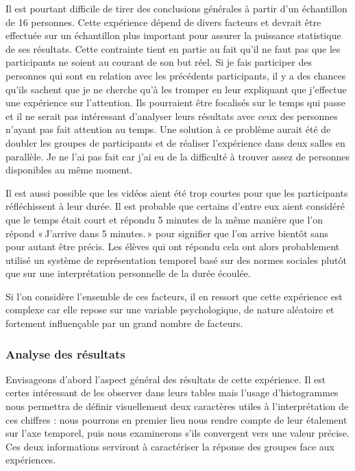\documentclass[12pt,fleqn,oneside,french,openany]{book} %
\begin{document}
Il est pourtant difficile de tirer des conclusions générales à partir d'un échantillon de 16 personnes. Cette expérience dépend de divers facteurs et devrait être effectuée sur un échantillon plus important pour assurer la puissance statistique de ses résultats. Cette contrainte tient en partie au fait qu'il ne faut pas que les participants ne soient au courant de son but réel. Si je fais participer des personnes qui sont en relation avec les précédents participants, il y a des chances qu'ils sachent que je ne cherche qu'à les tromper en leur expliquant que j'effectue une expérience sur l'attention. Ils pourraient être focalisés sur le temps qui passe et il ne serait pas intéressant d'analyser leurs résultats avec ceux des personnes n'ayant pas fait attention au temps. Une solution à ce problème aurait été de doubler les groupes de participants et de réaliser l'expérience dans deux salles en parallèle. Je ne l'ai pas fait car j'ai eu de la difficulté à trouver assez de personnes disponibles au même moment. 

Il est aussi possible que les vidéos aient été trop courtes pour que les participants réfléchissent à leur durée. Il est probable que certains d'entre eux aient considéré que le temps était court et répondu 5 minutes de la même manière que l'on répond «\,J'arrive dans 5 minutes.\,» pour signifier que l'on arrive bientôt sans pour autant être précis. Les élèves qui ont répondu cela ont alors probablement utilisé un système de représentation temporel basé sur des normes sociales plutôt que sur une interprétation personnelle de la durée écoulée.

Si l'on considère l'ensemble de ces facteurs, il en ressort que cette expérience est complexe car elle repose sur une variable psychologique, de nature aléatoire et fortement influençable par un grand nombre de facteurs.



\subsubsection{Analyse des résultats} \label{sssec:analyseResult1.1}
Envisageons d'abord l'aspect général des résultats de cette expérience. Il est certes intéressant de les observer dans leurs tables mais l'usage d'histogrammes nous permettra de définir visuellement deux caractères utiles à l'interprétation de ces chiffres : nous pourrons en premier lieu nous rendre compte de leur étalement sur l'axe temporel, puis nous examinerons s'ils convergent vers une valeur précise. Ces deux informations serviront à caractériser la réponse des groupes face aux expériences.
\end{document}
